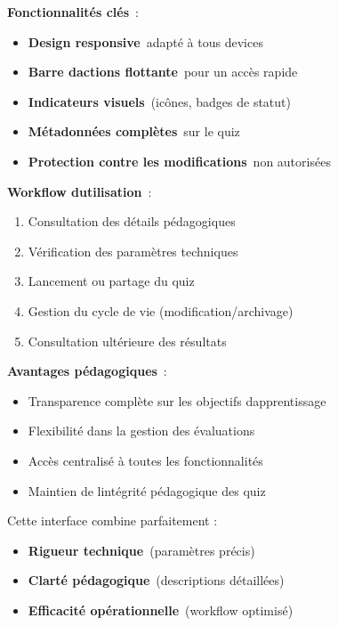\documentclass[12pt,a4paper,twoside]{report}
\begin{document}
\textbf{Fonctionnalités clés}~:

\begin{itemize}
\item
  \textbf{Design responsive}~adapté à tous devices
\item
  \textbf{Barre d\textquotesingle actions flottante}~pour un accès
  rapide
\item
  \textbf{Indicateurs visuels}~(icônes, badges de statut)
\item
  \textbf{Métadonnées complètes}~sur le quiz
\item
  \textbf{Protection contre les modifications}~non autorisées
\end{itemize}

\textbf{Workflow d\textquotesingle utilisation}~:

\begin{enumerate}
\def\labelenumi{\arabic{enumi}.}
\item
  Consultation des détails pédagogiques
\item
  Vérification des paramètres techniques
\item
  Lancement ou partage du quiz
\item
  Gestion du cycle de vie (modification/archivage)
\item
  Consultation ultérieure des résultats
\end{enumerate}

\textbf{Avantages pédagogiques}~:

\begin{itemize}
\item
  Transparence complète sur les objectifs
  d\textquotesingle apprentissage
\item
  Flexibilité dans la gestion des évaluations
\item
  Accès centralisé à toutes les fonctionnalités
\item
  Maintien de l\textquotesingle intégrité pédagogique des quiz
\end{itemize}

Cette interface combine parfaitement :

\begin{itemize}
\item
  \textbf{Rigueur technique}~(paramètres précis)
\item
  \textbf{Clarté pédagogique}~(descriptions détaillées)
\item
  \textbf{Efficacité opérationnelle}~(workflow optimisé)
\end{itemize}
\end{document}
